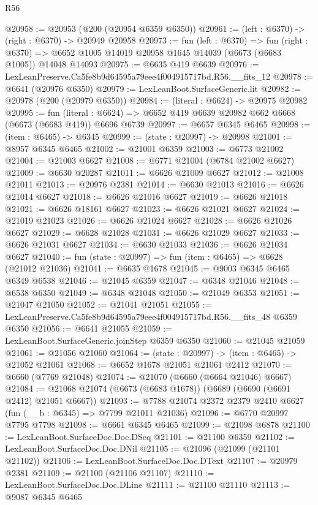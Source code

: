 \begin{lexlean}{R56}
\begin{coremodule}
@20958 := @20953 (@200 (@20954 @6359 @6350))
@20961 := (left : @6370) -> (right : @6370) -> @20949 @20958
@20973 := fun (left : @6370) =>
  fun (right : @6370) => @6652 @1005 @14019 @20958 @1645 @14039 (@6673 (@6683 @1005)) @14048 @14093
@20975 := @6635 @419 @6639
@20976 := LexLeanPreserve.Ca5fe8b9d64595a79eee4f004915717bd.R56.__fits_12
@20978 := @6641 (@20976 @6350)
@20979 := LexLeanBoot.SurfaceGeneric.lit
@20982 := @20978 (@200 (@20979 @6350))
@20984 := (literal : @6624) -> @20975 @20982
@20995 := fun (literal : @6624) =>
  @6652 @419 @6639 @20982 @662 @6668 (@6673 (@6683 @419)) @6696 @6739
@20997 := @6657 @6345 @6465
@20998 := (item : @6465) -> @6345
@20999 := (state : @20997) -> @20998
@21001 := @8957 @6345 @6465
@21002 := @21001 @6359
@21003 := @6773 @21002
@21004 := @21003 @6627
@21008 := @6771 @21004 (@6784 @21002 @6627)
@21009 := @6630 @20287
@21011 := @6626 @21009 @6627
@21012 := @21008 @21011
@21013 := @20976 @2381
@21014 := @6630 @21013
@21016 := @6626 @21014 @6627
@21018 := @6626 @21016 @6627
@21019 := @6626 @21018
@21021 := @6626 @18161 @6627
@21023 := @6626 @21021 @6627
@21024 := @21019 @21023
@21026 := @6626 @21024 @6627
@21028 := @6626 @21026 @6627
@21029 := @6628 @21028
@21031 := @6626 @21029 @6627
@21033 := @6626 @21031 @6627
@21034 := @6630 @21033
@21036 := @6626 @21034 @6627
@21040 := fun (state : @20997) => fun (item : @6465) => @6628 (@21012 @21036)
@21041 := @6635 @1678
@21045 := @9003 @6345 @6465 @6349 @6538
@21046 := @21045 @6359
@21047 := @6348 @21046
@21048 := @6538 @6350
@21049 := @6348 @21048
@21050 := @21049 @6353
@21051 := @21047 @21050
@21052 := @21041 @21051
@21055 := LexLeanPreserve.Ca5fe8b9d64595a79eee4f004915717bd.R56.__fits_48 @6359 @6350
@21056 := @6641 @21055
@21059 := LexLeanBoot.SurfaceGeneric.joinStep @6359 @6350
@21060 := @21045 @21059
@21061 := @21056 @21060
@21064 := (state : @20997) -> (item : @6465) -> @21052 @21061
@21068 := @6652 @1678 @21051 @21061 @2412
@21070 := @6660 (@7769 @21048)
@21074 := @21070 (@6660 (@6664 @21046) @6667)
@21084 := @21068 @21074 (@6673 (@6683 @1678)) (@6689 (@6690 (@6691 @2412) @21051 @6667))
@21093 := @7788 @21074 @2372 @2379 @2410 @6627 (fun (__b : @6345) => @7799 @21011 @21036)
@21096 := @6770 @20997 @7795 @7798
@21098 := @6661 @6345 @6465
@21099 := @21098 @6878
@21100 := LexLeanBoot.SurfaceDoc.Doc.DSeq
@21101 := @21100 @6359
@21102 := LexLeanBoot.SurfaceDoc.Doc.DNil
@21105 := @21096 (@21099 (@21101 @21102))
@21106 := LexLeanBoot.SurfaceDoc.Doc.DText
@21107 := @20979 @2381
@21109 := @21100 (@21106 @21107)
@21110 := LexLeanBoot.SurfaceDoc.Doc.DLine
@21111 := @21100 @21110
@21113 := @9087 @6345 @6465

\end{coremodule}
\end{lexlean}
